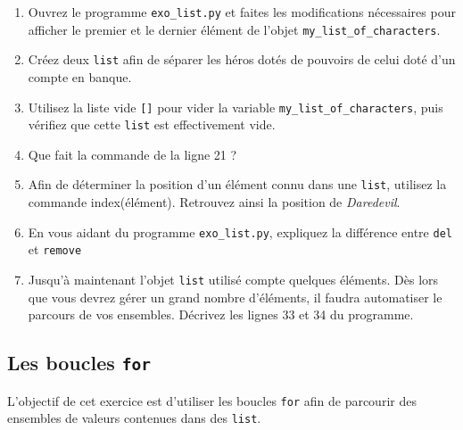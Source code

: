 \begin{enumerate}
\item  Ouvrez   le  programme  \texttt{exo\_list.py}  et   faites  les
  modifications  nécessaires pour  afficher  le premier  et le  dernier
  élément de l'objet \texttt{my\_list\_of\_characters}.  %
\item  Créez deux  \texttt{list} afin  de séparer  les héros  dotés de
  pouvoirs de celui doté d'un compte en banque.  %
\item  Utilisez  la liste  vide  \texttt{[]}  pour vider  la  variable
  \texttt{my\_list\_of\_characters}, 
  puis  vérifiez que  cette \texttt{list}
  est effectivement vide.  %
\item Que fait la commande de la ligne 21 ?  %
\item  Afin de  déterminer la  position  d'un élément  connu dans  une
  \texttt{list}, utilisez la commande index(élément).  Retrouvez ainsi
  la position de \textit{Daredevil}.

\item En vous aidant  du programme \texttt{exo\_list.py}, expliquez la
  différence entre \texttt{del} et \texttt{remove}

\item Jusqu'à maintenant l'objet \texttt{list} utilisé compte quelques
  éléments. Dès lors que vous  devrez gérer un grand nombre d'éléments,
  il faudra  automatiser le parcours  de vos ensembles.   Décrivez les
  lignes 33 et 34 du programme.
\end{enumerate}



\subsection{Les boucles  \texttt{for}}

L'objectif  de cet  exercice est  d'utiliser les  boucles \texttt{for}
afin  de  parcourir  des  ensembles  de  valeurs  contenues  dans  des
\texttt{list}.



